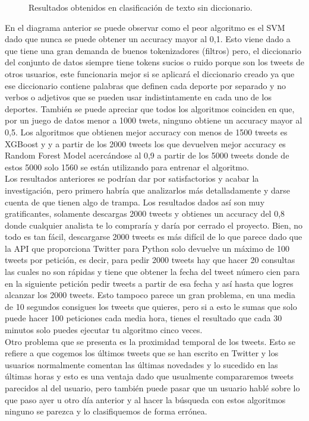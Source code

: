 \documentclass[../all.tex]{subfiles}
\begin{document}
	\begin{figure}[H]
		\centering
		\caption{Resultados obtenidos en clasificación de texto sin diccionario.}
	\end{figure}

	En el diagrama anterior se puede observar como el peor algoritmo es el SVM dado que nunca se puede obtener un accuracy mayor al 0,1. Esto viene dado a que  tiene una gran demanda de buenos tokenizadores (filtros) pero, el diccionario del conjunto de datos siempre tiene tokens sucios o ruido porque son los tweets de otros usuarios, este funcionaria mejor si se aplicará el diccionario creado ya que ese diccionario contiene palabras que definen cada deporte por separado y no verbos o adjetivos que se pueden usar indistintamente en cada uno de los deportes. También se puede apreciar que todos los algoritmos coinciden en que, por un juego de datos menor a 1000 twets, ninguno obtiene un accuracy mayor al 0,5.  Los algoritmos que obtienen mejor accuracy con menos de 1500 tweets es XGBoost y y a partir de los 2000 tweets los que devuelven mejor accuracy es Random Forest Model acercándose al 0,9 a partir de los 5000 tweets donde de estos 5000 solo 1560 se están utilizando para entrenar el algoritmo.\\
	
	Los resultados anteriores se podrían dar por satisfactorios y acabar la investigación, pero primero habría que analizarlos más detalladamente y darse cuenta de que tienen algo de trampa.  Los resultados dados así son muy gratificantes, solamente descargas 2000 tweets y obtienes un accuracy del 0,8 donde cualquier analista te lo compraría y daría por cerrado el proyecto. Bien, no todo es tan fácil, descargarse 2000 tweets es más difícil de lo que parece dado que la API que proporciona Twitter para Python solo devuelve un máximo de 100 tweets por petición, es decir, para pedir 2000 tweets hay que hacer 20 consultas las cuales no son rápidas y tiene que obtener la fecha del tweet número cien para en la siguiente petición pedir tweets a partir de esa fecha y así hasta que logres alcanzar los 2000 tweets. Esto tampoco parece un gran problema, en una media de 10 segundos consigues los tweets que quieres, pero si a esto le sumas que solo puede hacer 100 peticiones cada media hora, tienes el resultado que cada 30 minutos solo puedes ejecutar tu algoritmo cinco veces.\\
	
	Otro problema que se presenta es la proximidad temporal de los tweets. Esto se refiere a que cogemos los últimos tweets que se han escrito en Twitter y los usuarios normalmente comentan las últimas novedades y lo sucedido en las últimas horas y esto es una ventaja dado que usualmente compararemos tweets parecidos al del usuario, pero también puede pasar que un usuario hablé sobre lo que paso ayer u otro día anterior y al hacer la búsqueda con estos algoritmos ninguno se parezca y lo clasifiquemos de forma errónea.\\
	
\end{document}
